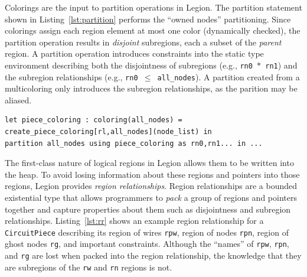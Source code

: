 Colorings are the input to partition operations in Legion.  The partition
statement shown in Listing~\ref{lst:partition} performs the ``owned nodes''
partitioning.    Since colorings assign each region element at most one color
(dynamically checked), the partition operation results in 
{\em disjoint} subregions, each a subset of the {\em parent} region.
A partition operation introduces constraints into the static type environment describing
both the disjointness of subregions (e.g., {\tt rn0 $*$ rn1})
and the subregion relationships
(e.g., {\tt rn0 $\leq$ all\_nodes}).  A partition created from a multicoloring
only introduces the subregion relationships, as the parition may be aliased.




\begin{lstlisting}[label={lst:partition},caption={Partition Operation Example}]
let piece_coloring : coloring(all_nodes) = create_piece_coloring[rl,all_nodes](node_list) in
partition all_nodes using piece_coloring as rn0,rn1... in ...
\end{lstlisting}



The first-class nature of logical regions in Legion allows them to
be written into the heap.  To avoid losing information about these regions and pointers
into those regions, Legion provides {\em region
relationships}.  Region relationships are a bounded existential type
that allows programmers to {\em pack} a group of regions and pointers together and capture
properties about them such as disjointness and subregion relationships.
Listing~\ref{lst:rr} shows an example region relationship for a {\tt CircuitPiece} 
describing its region of wires {\tt rpw}, region of 
nodes {\tt rpn}, region of ghost nodes {\tt rg}, and important constraints.  Although the
``names'' of {\tt rpw}, {\tt rpn}, and {\tt rg} are lost when packed into the region relationship,
the knowledge that they are subregions of the {\tt rw} and {\tt rn} regions is not.

